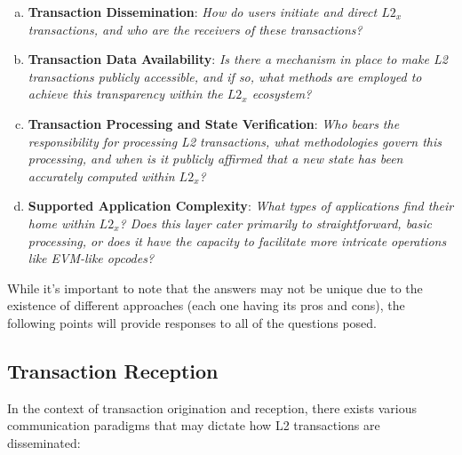 \begin{enumerate}[(a)]

\item \textbf{Transaction Dissemination}: \textit{How do users initiate and direct $L2_x$ transactions, and who are the receivers of these transactions?}

\item \textbf{Transaction Data Availability}: \textit{Is there a mechanism in place to make L2 transactions publicly accessible, and if so, what methods are employed to achieve this transparency within the $L2_x$ ecosystem?}

\item \textbf{Transaction Processing and State Verification}: \textit{Who bears the responsibility for processing L2 transactions, what methodologies govern this processing, and when is it publicly affirmed that a new state has been accurately computed within $L2_x$?}

\item \textbf{Supported Application Complexity}: \textit{What types of applications find their home within $L2_x$? Does this layer cater primarily to straightforward, basic processing, or does it have the capacity to facilitate more intricate operations like EVM-like opcodes?}

\end{enumerate}

While it's important to note that the answers may not be unique due to the existence of different approaches (each one having its pros and cons), the following points will provide responses to all of the questions posed.

\subsection{Transaction Reception}

In the context of transaction origination and reception, there exists various communication paradigms that may dictate how L2 transactions are disseminated:

